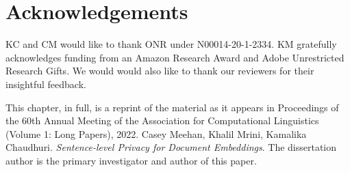 
\section*{Acknowledgements} 
KC and CM would like to thank ONR under N00014-20-1-2334. KM gratefully acknowledges funding from an Amazon Research Award and Adobe Unrestricted Research Gifts. We would would also like to thank our reviewers for their insightful feedback.

This chapter, in full, is a reprint of the material as it appears in Proceedings of the 60th Annual Meeting of the Association for Computational Linguistics (Volume 1: Long Papers), 2022. Casey Meehan, Khalil Mrini, Kamalika Chaudhuri. \emph{Sentence-level Privacy for Document Embeddings}. The dissertation author is the primary investigator and author of this paper. 


%


